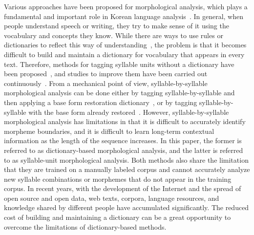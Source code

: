 \documentclass[AMS,STIX2COL]{WileyNJD-v2}
\begin{document}
    Various approaches have been proposed for morphological analysis, which plays a fundamental and important role in Korean language analysis~\cite{KwonHC1991, LeeDG2009, ShimKS2011, LeeJS2011, ShinJC2012, LeeCK2013, NaSH2014, NaSH2015, HwangHS2016, KimHM2016, ChungES2016, LeeCH2016, Li2017, NaSH2018, KimSW2018, ChoiYS2018, MinJW2018, MinJW2019, KimHM2019, SongHJ2019, MinJW2020, SongHJ2020, ChoiYS2020, HwangHS2020, KimHJ2021, YounJY2021, MinJW2022, KimJM2022, ShinHJ2023}.
    In general, when people understand speech or writing, they try to make sense of it using the vocabulary and concepts they know.
    While there are ways to use rules or dictionaries to reflect this way of understanding~\cite{KwonHC1991}, the problem is that it becomes difficult to build and maintain a dictionary for vocabulary that appears in every text.
    Therefore, methods for tagging syllable units without a dictionary have been proposed~\cite{ShimKS2011, LeeCK2013, LeeCH2016, KimHM2016}, and studies to improve them have been carried out continuously~\cite{KimSW2018, ChoiYS2018, KimHM2019, MinJW2019, SongHJ2019, SongHJ2020, YounJY2021, ShinHJ2023}.
    From a mechanical point of view, syllable-by-syllable morphological analysis can be done either by tagging syllable-by-syllable and then applying a base form restoration dictionary~\cite{ShimKS2011, LeeCH2016}, or by tagging syllable-by-syllable with the base form already restored~\cite{YounJY2021}.
    However, syllable-by-syllable morphological analysis has limitations in that it is difficult to accurately identify morpheme boundaries, and it is difficult to learn long-term contextual information as the length of the sequence increases.
    In this paper, the former is referred to as dictionary-based morphological analysis, and the latter is referred to as syllable-unit morphological analysis.
    Both methods also share the limitation that they are trained on a manually labeled corpus and cannot accurately analyze new syllable combinations or morphemes that do not appear in the training corpus.
    In recent years, with the development of the Internet and the spread of open source and open data, web texts, corpora, language resources, and knowledge shared by different people have accumulated significantly.
    The reduced cost of building and maintaining a dictionary can be a great opportunity to overcome the limitations of dictionary-based methods.
\end{document}
